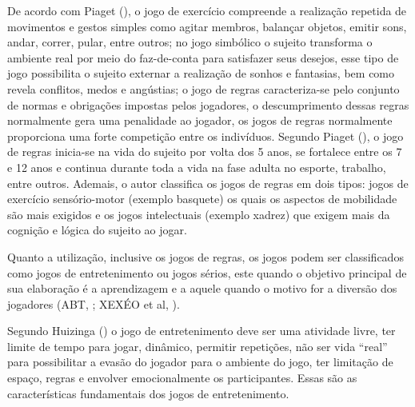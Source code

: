 De acordo com Piaget (\citeyear{piaget1969}), o jogo de exercício compreende a realização repetida de movimentos e gestos simples como agitar membros, balançar objetos, emitir sons, andar, correr, pular, entre outros; no jogo simbólico o sujeito transforma o ambiente real por meio do faz-de-conta para satisfazer seus desejos, esse tipo de jogo possibilita o sujeito externar a realização de sonhos e fantasias, bem como revela conflitos, medos e angústias; o jogo de regras caracteriza-se pelo conjunto de normas e obrigações impostas pelos jogadores, o descumprimento dessas regras normalmente gera uma penalidade ao jogador, os jogos de regras normalmente proporciona uma forte competição entre os indivíduos. Segundo Piaget (\citeyear{piaget1969}), o jogo de regras inicia-se na vida do sujeito por volta dos 5 anos, se fortalece entre os 7 e 12 anos e continua durante toda a vida na fase adulta no esporte, trabalho, entre outros. Ademais, o autor classifica os jogos de regras em dois tipos: jogos de exercício sensório-motor (exemplo basquete) os quais os aspectos de mobilidade são mais exigidos e os jogos intelectuais (exemplo xadrez) que exigem mais da cognição e lógica do sujeito ao jogar.

Quanto a utilização, inclusive os jogos de regras, os jogos podem ser classificados como jogos de entretenimento ou jogos sérios, este quando o objetivo principal de sua elaboração é a aprendizagem e a aquele quando o motivo for a diversão dos jogadores (ABT, \citeyear{abt1970}; XEXÉO et al, \citeyear{xexeo2017}).

Segundo Huizinga (\citeyear{huizinga2000}) o jogo de entretenimento deve ser uma atividade livre, ter limite de tempo para jogar, dinâmico, permitir repetições, não ser vida “real” para possibilitar a evasão do jogador para o ambiente do jogo, ter limitação de espaço, regras e envolver emocionalmente os participantes. Essas são as características fundamentais dos jogos de entretenimento.

